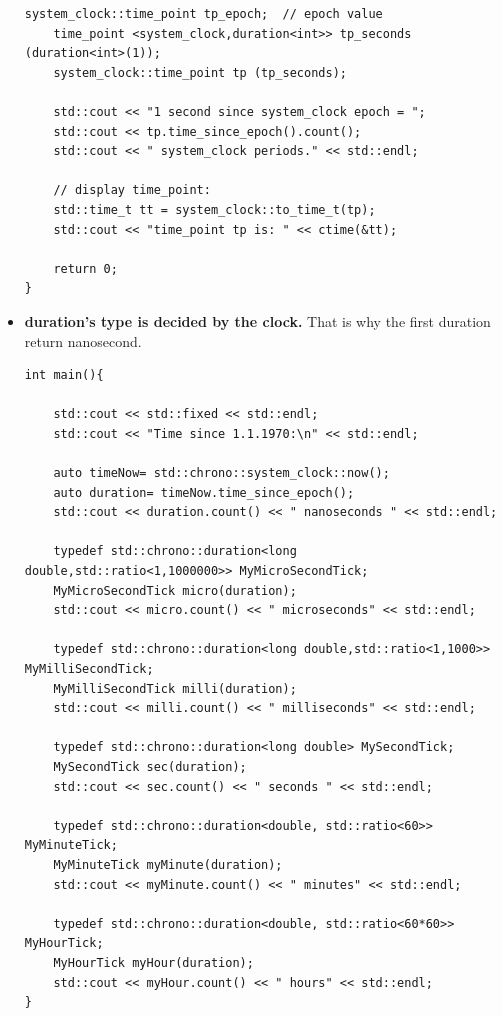 \documentclass[a4paper,11pt,twoside]{book}
\begin{document}
\begin{itemize}
\begin{lstlisting}[numbers=none]
	system_clock::time_point tp_epoch;	// epoch value
	time_point <system_clock,duration<int>> tp_seconds (duration<int>(1));
	system_clock::time_point tp (tp_seconds);
	
	std::cout << "1 second since system_clock epoch = ";
	std::cout << tp.time_since_epoch().count();
	std::cout << " system_clock periods." << std::endl;
	
	// display time_point:
	std::time_t tt = system_clock::to_time_t(tp);
	std::cout << "time_point tp is: " << ctime(&tt);
	
	return 0;
}
\end{lstlisting}
	
	\item \textbf{duration's type is decided by the clock. } That is why the first duration return nanosecond. 
\begin{lstlisting}[numbers=none]
int main(){	
	
	std::cout << std::fixed << std::endl;
	std::cout << "Time since 1.1.1970:\n" << std::endl;
	
	auto timeNow= std::chrono::system_clock::now();
	auto duration= timeNow.time_since_epoch();
	std::cout << duration.count() << " nanoseconds " << std::endl;
	
	typedef std::chrono::duration<long double,std::ratio<1,1000000>> MyMicroSecondTick;
	MyMicroSecondTick micro(duration);
	std::cout << micro.count() << " microseconds" << std::endl;
	
	typedef std::chrono::duration<long double,std::ratio<1,1000>> MyMilliSecondTick;
	MyMilliSecondTick milli(duration);
	std::cout << milli.count() << " milliseconds" << std::endl;
	
	typedef std::chrono::duration<long double> MySecondTick;
	MySecondTick sec(duration);
	std::cout << sec.count() << " seconds " << std::endl;
	
	typedef std::chrono::duration<double, std::ratio<60>> MyMinuteTick;
	MyMinuteTick myMinute(duration);
	std::cout << myMinute.count() << " minutes" << std::endl;
	
	typedef std::chrono::duration<double, std::ratio<60*60>> MyHourTick;
	MyHourTick myHour(duration);
	std::cout << myHour.count() << " hours" << std::endl;
}
\end{lstlisting}

\end{itemize}
\end{document}
